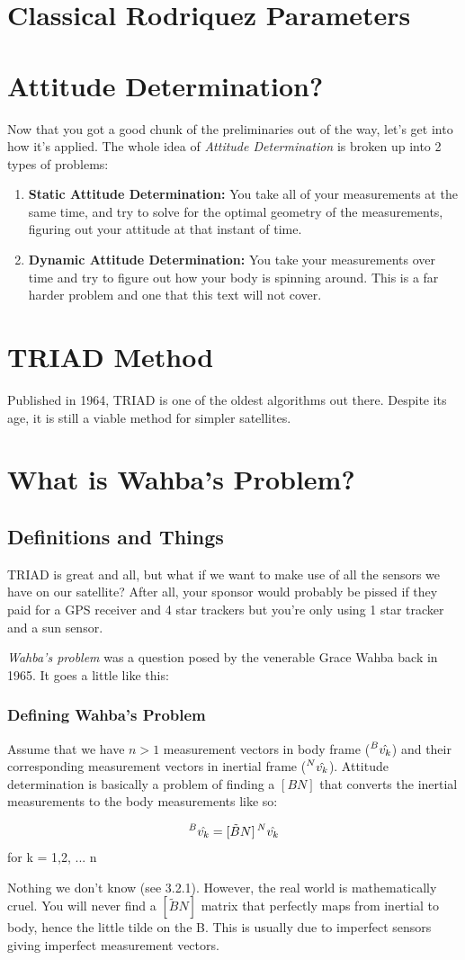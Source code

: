 \documentclass[a4paper,14pt]{extreport}
\newcommand{\vk}[1]{\prescript{#1}{}{\hat{v_k}}}
\begin{document}
\chapter{Classical Rodriquez Parameters}
\chapter{Attitude Determination?}
Now that you got a good chunk of the preliminaries out of the way, let's get into how it's applied. The whole idea of \emph{Attitude Determination} is broken up into 2 types of problems:
\begin{enumerate}
\item{
\textbf{Static Attitude Determination:} You take all of your measurements at the same time, and try to solve for the optimal geometry of the measurements, figuring out your attitude at that instant of time.
}
\item{\textbf{Dynamic Attitude Determination:} You take your measurements over time and try to figure out how your body is spinning around. This is a far harder problem and one that this text will not cover.
}
\end{enumerate}


\chapter{TRIAD Method}
Published in 1964, TRIAD is one of the oldest algorithms out there. Despite its age, it is still a viable method for simpler satellites.
\chapter{What is Wahba's Problem?}
\section{Definitions and Things}
TRIAD is great and all, but what if we want to make use of all the sensors we have on our satellite? After all, your sponsor would probably be pissed if they paid for a GPS receiver and 4 star trackers but you're only using 1 star tracker and a sun sensor.

\emph{Wahba's problem} was a question posed by the venerable Grace Wahba back in 1965. It goes a little like this:
\subsection{Defining Wahba's Problem}
Assume that we have $n>1$ measurement vectors in body frame ($\vk{B}$) and their corresponding measurement vectors in inertial frame ($\vk{N}$). Attitude determination is basically a problem of finding a $[BN]$ that converts the inertial measurements to the body measurements like so:
\begin{center}
\[
\vk{B}= [\tilde{B}N]\vk{N}
\]
for k = 1,2, ... n
\end{center}
Nothing we don't know (see 3.2.1). However, the real world is mathematically cruel. You will never find a $[\tilde{B}N]$ matrix that perfectly maps from inertial to body, hence the little tilde on the B. This is usually due to imperfect sensors giving imperfect measurement vectors. 
\end{document}
